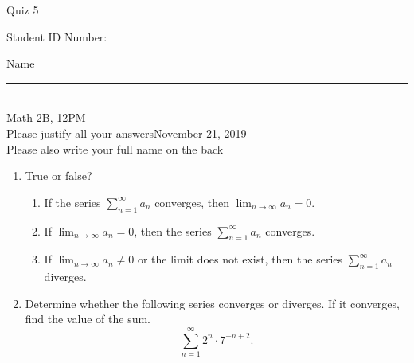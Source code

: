 \documentclass[12pt]{article}
\begin{document}
\begin{flushleft} 
\centerline{\LARGE{Quiz 5}} 
\vspace{5 mm}
{Student ID Number:}\hfill  
{Name \rule {2 in}{0.01in}}\\
Math 2B, 12PM
\\
{Please justify all your answers}\hfill {November 21, 2019}
\\
{Please also write your full name on the back} 

\medskip
\end{flushleft}

\begin{enumerate}
	\item True or false?
	\begin{enumerate}
		\item If the series $\sum_{n=1}^\infty a_n$ converges, then $\lim_{n\to \infty}a_n = 0$.
		\item If $\lim_{n\to \infty}a_n = 0$, then the series $\sum_{n=1}^\infty a_n$ converges.
		\item If $\lim_{n\to \infty}a_n \neq 0$ or the limit does not exist, then the series $\sum_{n=1}^\infty a_n$ diverges.
	\end{enumerate}

	\item Determine whether the following series converges or diverges. If it converges, find the value of the sum.
	\[
	\sum_{n=1}^\infty 2^n\cdot 7^{-n+2}.
	\]
\end{enumerate}

\end{document}
